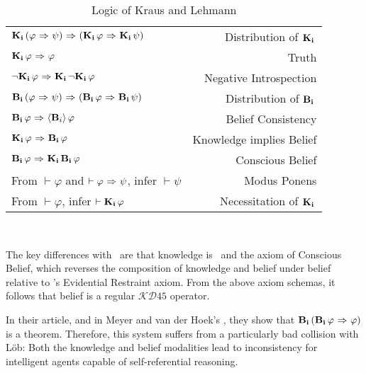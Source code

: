 \begin{table}[H]
	\begin{center}
		\begin{tabular}{| l r |}
			\hline
			$\mathbf{K}_{\mathbf{i}}\,(\varphi {\ \Rightarrow \ } \psi) {\ \Rightarrow \ } (\mathbf{K}_{\mathbf{i}}\,\varphi {\ \Rightarrow \ } \mathbf{K}_{\mathbf{i}}\,\psi)$ & Distribution of $\mathbf{K}_{\mathbf{i}}\,$ \\
			$\mathbf{K}_{\mathbf{i}}\,\varphi {\ \Rightarrow \ } \varphi$ & Truth \\
			${\neg}\mathbf{K}_{\mathbf{i}}\,\varphi {\ \Rightarrow \ } \mathbf{K}_{\mathbf{i}}\,{\neg}\mathbf{K}_{\mathbf{i}}\,\varphi$ & Negative Introspection \\
			$\mathbf{B}_{\mathbf{i}}\,(\varphi {\ \Rightarrow \ } \psi) {\ \Rightarrow \ } (\mathbf{B}_{\mathbf{i}}\,\varphi {\ \Rightarrow \ } \mathbf{B}_{\mathbf{i}}\,\psi)$ & Distribution of $\mathbf{B}_{\mathbf{i}}\,$\\
			$\mathbf{B}_{\mathbf{i}}\,\varphi {\ \Rightarrow \ } \langle \mathbf{B}_{i} \rangle\,\varphi$ & Belief Consistency \\
			$\mathbf{K}_{\mathbf{i}}\,\varphi {\ \Rightarrow \ } \mathbf{B}_{\mathbf{i}}\,\varphi$ & Knowledge implies Belief \\
			$\mathbf{B}_{\mathbf{i}}\,\varphi {\ \Rightarrow \ } \mathbf{K}_{\mathbf{i}}\,\mathbf{B}_{\mathbf{i}}\,\varphi$ & Conscious Belief\\
			From $\vdash \varphi$ and $\vdash \varphi {\ \Rightarrow \ } \psi$, infer $\vdash\psi$ & Modus Ponens\\
			From $\vdash \varphi$, infer $\vdash \mathbf{K}_{\mathbf{i}}\,\varphi$ & Necessitation of $\mathbf{K}_{\mathbf{i}}\,$\\
			\hline
		\end{tabular}
		\caption{Logic of Kraus and Lehmann}~\label{KL}
	\end{center}
\end{table}

The key differences with \DASL\ are that knowledge is \SFive\ and the axiom of Conscious Belief, which reverses the composition of knowledge and belief under belief relative to \DASL's Evidential Restraint axiom. From the above axiom schemas, it follows that belief is a regular $\mathcal{KD}45$ operator.

In their article, and in Meyer and van der Hoek's \cite{MeyerHoek}, they show that $\mathbf{B}_{\mathbf{i}}\,(\mathbf{B}_{\mathbf{i}}\,\varphi {\ \Rightarrow \ } \varphi)$ is a theorem. Therefore, this system suffers from a particularly bad collision with L\"ob: Both the knowledge and belief modalities lead to inconsistency for intelligent agents capable of self-referential reasoning. 

